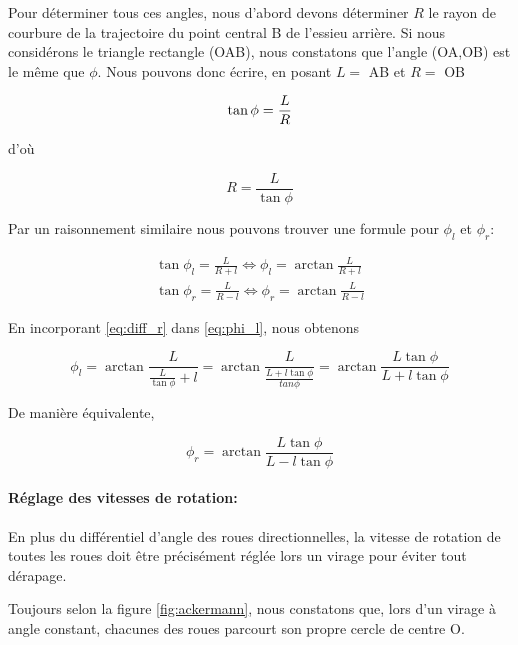 \documentclass[12pt,a4paper]{report}
\begin{document}
			\para Pour déterminer tous ces angles, nous d'abord devons déterminer $R$ le rayon de courbure de la trajectoire du point central B de l'essieu arrière. Si nous considérons le triangle rectangle (OAB), nous constatons que l'angle (OA,OB) est le même que $\phi$. Nous pouvons donc écrire, en posant $L=$ AB et $R=$ OB 
			
			\begin{equation}
			\tan{\phi} = \frac{L}{R} \\
			\end{equation}
			
			d'où
			
			\begin{equation}
			\label{eq:diff_r}
			R = \frac{L}{\tan{\phi}}
			\end{equation}
			
			\para Par un raisonnement similaire nous pouvons trouver une formule pour $\phi_l$ et $\phi_r$:
			
			\begin{gather}
			\label{eq:phi_l}
			\tan{\phi_l} = \frac{L}{R+l} \Longleftrightarrow \phi_l = \arctan{\frac{L}{R+l}} \\[2ex]
			\tan{\phi_r} = \frac{L}{R-l} \Longleftrightarrow \phi_r = \arctan{\frac{L}{R-l}}
			\end{gather}
			
			En incorporant \ref{eq:diff_r} dans \ref{eq:phi_l}, nous obtenons
			
			\begin{equation}
			\phi_l = \arctan{\frac{L}{\frac{L}{\tan{\phi}} + l}} = \arctan{\frac{L}{\frac{L + l\tan{\phi}}{tan{\phi}}}} = \arctan{\frac{L \tan{\phi}}{L+l \tan{\phi}}}
			\end{equation}
			
			\para De manière équivalente, 
			
			\begin{equation}
			\phi_r = \arctan{\frac{L\tan{\phi}}{L - l \tan{\phi}}}
			\end{equation}
			
			\paragraph*{Réglage des vitesses de rotation:} En plus du différentiel d'angle des roues directionnelles, la vitesse de rotation de toutes les roues doit être précisément réglée lors un virage pour éviter tout dérapage.
			
			\para Toujours selon la figure \ref{fig:ackermann}, nous constatons que, lors d'un virage à angle constant, chacunes des roues parcourt son propre cercle de centre O. 
			
\end{document}
